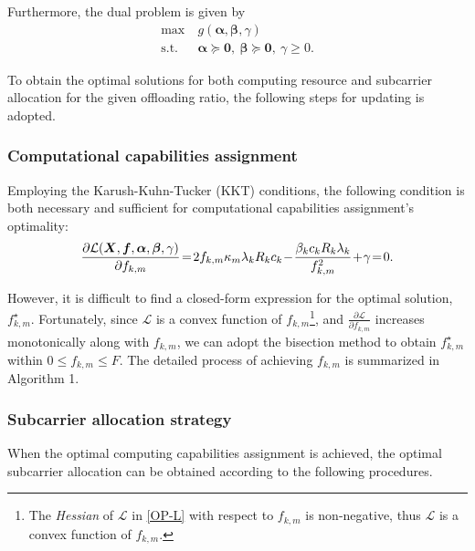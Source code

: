 \documentclass[journal]{IEEEtran}
\begin{document}
Furthermore, the dual problem is given by
\begin{equation}\label{OP-DP}
\begin{aligned}
\max ~&g(\boldsymbol\alpha,\boldsymbol\beta,\gamma)\\
\mathrm{s.t.} ~&\boldsymbol{\alpha}\succeq \boldsymbol{0},~\boldsymbol{\beta}\succeq \boldsymbol{0},~\gamma \geq 0.
\end{aligned}    
\end{equation}

To obtain the optimal solutions for both computing resource and subcarrier allocation for the given offloading ratio, the following steps for updating is adopted. 
\subsubsection{Computational capabilities assignment}
Employing the Karush-Kuhn-Tucker (KKT) conditions, the following condition is both necessary and  sufficient for computational capabilities assignment's optimality:
\begin{equation}{\label{op-f}}
\begin{aligned}
\frac{\partial\mathcal{L}(\boldsymbol{X},\boldsymbol{f},\boldsymbol\alpha,\boldsymbol\beta,\gamma)}{\partial{f_{k,m}}}\!=\! 2f_{k,m}\kappa_m\lambda_{k}R_{k}c_{k}
\!-\!\frac{\beta_{k}c_{k}R_{k}\lambda_{k}}{f_{k,m}^2}\!+\!\gamma\! =\! 0.
\end{aligned}
\end{equation}

However, it is difficult to find a closed-form expression for the optimal solution, $f_{k,m}^\star$. Fortunately, since $\mathcal{L}$ is a convex function of $f_{k,m}$\footnote{The \emph{Hessian} of $\mathcal{L}$ in \eqref{OP-L} with respect to $f_{k,m}$ is non-negative, thus $\mathcal{L}$ is a convex function of $f_{k,m}$\cite{boyd2004convex}.}, and $\frac{\partial\mathcal{L}}{\partial{f_{k,m}}}$ increases monotonically along with $f_{k,m}$, we can adopt the bisection method to obtain $f_{k,m}^\star$ within $0\leq f_{k,m}\leq F$. The detailed process of achieving $f_{k,m}$ is summarized in Algorithm 1.

\subsubsection{Subcarrier allocation strategy}
When the optimal computing capabilities assignment is achieved, the optimal subcarrier allocation can be obtained according to the following procedures. 
\end{document}
